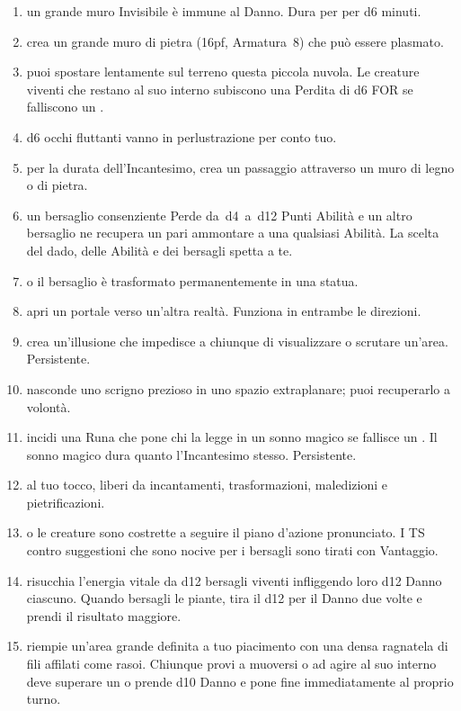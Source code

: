 \documentclass[itdr]{subfiles}
\begin{document}
\begin{enumerate}
	\item {} un grande muro Invisibile è immune al Danno. Dura per per d6 minuti.
	\item {} crea un grande muro di pietra (16pf, Armatura~8) che può essere plasmato.
	\item {} puoi spostare lentamente sul terreno questa piccola nuvola. Le creature viventi che restano al suo interno subiscono una Perdita di d6 FOR se falliscono un .
	\item {} d6 occhi fluttanti vanno in perlustrazione per conto tuo.
	\item {} per la durata dell'Incantesimo, crea un passaggio attraverso un muro di legno o di pietra.
	\item {} un bersaglio consenziente Perde \mbox{da d4 a d12} Punti Abilità e un altro bersaglio ne recupera un pari ammontare a una qualsiasi Abilità. La scelta del dado, delle \mbox{Abilità} e dei bersagli spetta a te.
	\item {}  o il bersaglio è trasformato permanentemente in una statua.
	\item {} apri un portale verso un'altra realtà. Funziona in entrambe le direzioni.
	\item {} crea un'illusione che impedisce a chiunque di visualizzare o scrutare un'area. Persistente.
	\item {} nasconde uno scrigno prezioso in uno spazio extraplanare; puoi recuperarlo a volontà.
	\item {} incidi una Runa che pone chi la legge in un sonno magico se fallisce un . Il sonno magico dura quanto l'Incantesimo stesso. Persistente.
	\item {} al tuo tocco, liberi da incantamenti, trasformazioni, maledizioni e pietrificazioni.
	\item {}  o le creature sono costrette a seguire il piano d'azione pronunciato. I TS contro suggestioni che sono nocive per i bersagli sono tirati con Vantaggio.
	\item {} risucchia l'energia vitale da d12 bersagli viventi infliggendo loro d12 Danno ciascuno. Quando bersagli le piante, tira il d12 per il Danno due volte e prendi il risultato maggiore.
	\item {} riempie un'area grande definita a tuo piacimento con una densa ragnatela di fili affilati come rasoi. Chiunque provi a muoversi o ad agire al suo interno deve superare un  o prende d10 Danno e pone fine immediatamente al proprio turno.

\end{enumerate}
\end{document}
